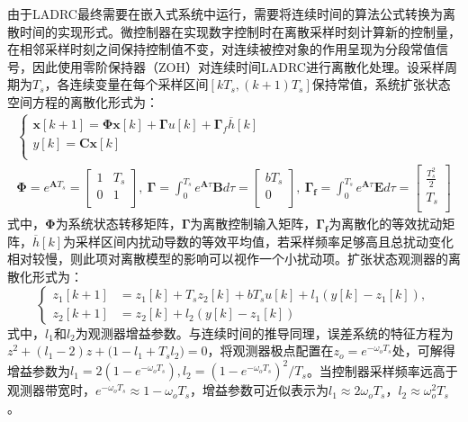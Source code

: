 由于LADRC最终需要在嵌入式系统中运行，需要将连续时间的算法公式转换为离散时间的实现形式。微控制器在实现数字控制时在离散采样时刻计算新的控制量，在相邻采样时刻之间保持控制值不变，对连续被控对象的作用呈现为分段常值信号，因此使用零阶保持器（ZOH）对连续时间LADRC进行离散化处理。设采样周期为$T_s$，各连续变量在每个采样区间$[kT_s, (k+1)T_s]$保持常值，系统扩张状态空间方程的离散化形式为：
\begin{equation}
	\begin{gathered}
		\begin{cases} {\mathbf{x} [ k+1 ]=\mathbf{\Phi} \mathbf{x} [ k ]+\mathbf{\Gamma} u [ k ]+\mathbf{\Gamma}_f} \overline{h} [k] \\ {y[k]=\mathbf{C} \mathbf{x}[k]} \\ \end{cases} \\
		\mathbf{\Phi}=e^{\mathbf{A} T_s} = \left[ \begin{matrix} {1} & {T_s} \\ {0} & {1} \\ \end{matrix} \right], \ \mathbf{\Gamma}=\int_{0}^{T_s} e^{\mathbf{A} \tau} \mathbf{B} d \tau = \left[ \begin{matrix} {b T_s} \\ {0} \\ \end{matrix} \right], \ \mathbf{\Gamma_f}=\int_{0}^{T_s} e^{\mathbf{A} \tau} \mathbf{E} d \tau = \left[ \begin{matrix} {\frac{T_s^2} {2}} \\ {T_s} \\ \end{matrix} \right]
	\end{gathered} \label{ladrc:discrete}
\end{equation}
式中，$\mathbf{\Phi}$为系统状态转移矩阵，$\mathbf{\Gamma}$为离散控制输入矩阵，$\mathbf{\Gamma_f}$为离散化的等效扰动矩阵，$\overline{h} [k]$为采样区间内扰动导数的等效平均值，若采样频率足够高且总扰动变化相对较慢，则此项对离散模型的影响可以视作一个小扰动项。扩张状态观测器的离散化形式为：
\begin{equation}
	\left\{
	\begin{aligned}
		z_1[k+1] & = z_1[k] + T_s z_2[k] + b T_s u[k] + l_1(y[k]-z_1[k]), \\    \label{ladrc:discrete_eso}
		z_2[k+1] & = z_2[k] + l_2(y[k]-z_1[k])
	\end{aligned}
	\right.
\end{equation}
式中，$l_1$和$l_2$为观测器增益参数。与连续时间的推导同理，误差系统的特征方程为$z^{2}+( l_{1}-2 ) z+\big( 1-l_{1}+T_{s} l_{2} \big)=0$，将观测器极点配置在$z_o=e^{-\omega_o T_s}$处，可解得增益参数为$l_{1}=2 {\left( {1-e^{-\omega_{o} T_{s}}} \right)}, l_{2}=\left( 1-e^{-\omega_{o} T_{s}} \right)^{2}/{T_{s}}$。当控制器采样频率远高于观测器带宽时，$e^{-\omega_{o} T_{s}} \approx 1-\omega_{o} T_{s}$，增益参数可近似表示为$l_1 \approx 2 \omega_o T_s$，$l_2 \approx \omega_o^2 T_s$。

